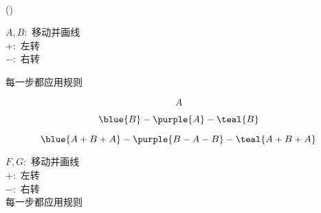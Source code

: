 \begin{frame}{}

  \vspace{0.30cm}
  \begin{center}
    \href{https://en.wikipedia.org/wiki/L-system}{} \\[6pt]
    ()
  \end{center}
\end{frame}

\begin{frame}{}

  \vspace{0.20cm}
  \begin{center}
    $A, B:$ 移动并画线 \\[12pt]
    $+:$ 左转 \\[12pt]
    $-:$ 右转

    \vspace{0.60cm}
    每一步都应用规则
  \end{center}
\end{frame}

\begin{frame}{}
  \begin{center}
    \[
      A
    \]

    \[
      \blue{B} - \purple{A} - \teal{B}
    \]

    \pause
    \[
      \blue{A + B + A} - \purple{B - A - B} - \teal{A + B + A}
    \]

    \pause
  \end{center}
\end{frame}

\begin{frame}{}
  \begin{center}
  \end{center}
\end{frame}

\begin{frame}{}

  \vspace{0.20cm}
  \begin{center}
    $F, G:$ 移动并画线 \\[12pt]
    $+:$ 左转 \\[12pt]
    $-:$ 右转 \\[12pt]

    \vspace{0.20cm}
    每一步都应用规则
  \end{center}
\end{frame}

